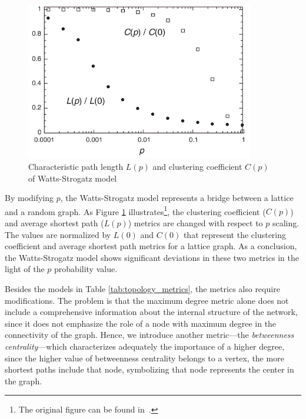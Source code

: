 \begin{figure}[!ht]
	\centering
	\includegraphics[width=100mm, keepaspectratio]{figures/ws_metrics.png}
	\caption{Characteristic path length $L(p)$ and clustering coefficient $C(p)$ of Watts-Strogatz model}
	\label{fig:ws}
\end{figure}

By modifying $p$, the Watts-Strogatz model represents a bridge between a lattice and a random graph. As Figure \ref{fig:ws} illustrates\footnote{The original figure can be found in~\cite{ws_metrics}.}, the clustering coefficient ($C(p)$) and average shortest path ($L(p)$) metrics are changed with respect to $p$ scaling. The values are normalized by $L(0)$ and $C(0)$ that represent the clustering coefficient and average shortest path metrics for a lattice graph. As a conclusion, the Watts-Strogatz model shows significant deviations in these two metrics in the light of the $p$ probability value. 

Besides the models in Table \ref{tab:topology_metrics}, the metrics also require modifications. The problem is that the maximum degree metric alone does not include a comprehensive information about the internal structure of the network, since it does not emphasize the role of a node with maximum degree in the connectivity of the graph. Hence, we introduce another metric---the \textit{betweenness centrality}---which characterizes adequately the importance of a higher degree, since the higher value of betweenness centrality belongs to a vertex, the more shortest paths include that node, symbolizing that node represents the center in the graph.

